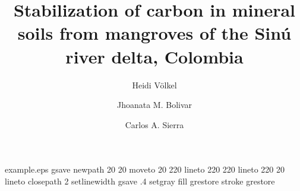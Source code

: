 %
%
%
%
%
\begin{filecontents*}{example.eps}
gsave
newpath
  20 20 moveto
  20 220 lineto
  220 220 lineto
  220 20 lineto
closepath
2 setlinewidth
gsave
  .4 setgray fill
grestore
stroke
grestore
\end{filecontents*}
%
\RequirePackage{fix-cm}
%
\documentclass[smallextended, referee]{svjour3}       %
%
\smartqed  %
%
\usepackage{graphicx}
\usepackage{here}
\usepackage{upgreek}
\usepackage{wasysym}
\usepackage{natbib}
\usepackage{lineno}
\usepackage{url}
%
%
%
%
%


\title{Stabilization of carbon in mineral soils from mangroves of the Sin\'{u} river delta, Colombia%
}


\author{Heidi V\"olkel         \and
        Jhoanata M. Bolivar  \and Carlos A. Sierra
}


